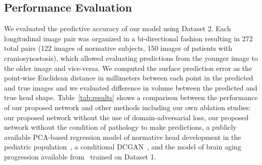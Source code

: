 \documentclass[conference]{IEEEtran}
\begin{document}
\subsection{Performance Evaluation}
We evaluated the predictive accuracy of our model using Dataset 2. Each longitudinal image pair was organized in a bi-directional fashion resulting in 272 total pairs (122 images of normative subjects, 150 images of patients with craniosynostosis), which allowed evaluating predictions from the younger image to the older image and vice-versa. We computed the surface prediction error as the point-wise Euclidean distance in millimeters between each point in the predicted and true images and we evaluated difference in volume between the predicted and true head shape. Table~\ref{tab:results} shows a comparison between the performance of our proposed network and other methods including our own ablation studies: our proposed network without the use of domain-adversarial loss, our proposed network without the condition of pathology to make predictions, a publicly available PCA-based regression model of normative head development in the pediatric population~\cite{Liu2022Data-driven}, a conditional DCGAN~\cite{Radford2016Unsupervised}, and the model of brain aging progression available from~\cite{Xia2021Learning} trained on Dataset 1.
\end{document}
